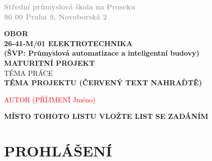 \documentclass[12pt,a4paper]{article} %
\begin{document}
\begin{titlepage}
\begin{minipage}{0.3\textwidth}
\end{minipage}
\begin{adjustbox}{minipage=0.55\textwidth,left}
	\textbf{\textcolor{darkgray}{
	Střední průmyslová škola na Proseku\\
	90 00 Praha 9, Novoborská 2}}
\end{adjustbox}

\center

\textbf{\large OBOR}\\[0.5cm]
\textbf{\large	26-41-M/01 ELEKTROTECHNIKA\\
				(ŠVP: Průmyslová automatizace a inteligentní budovy)}\\[4.5cm]
\textbf{\LARGE MATURITNÍ PROJEKT}\\[1.5cm]
\textsc{TÉMA PRÁCE}\\[1.5cm]
\textbf{\color{red} \huge \bfseries  TÉMA PROJEKTU (ČERVENÝ TEXT NAHRAĎTĚ)}

\vspace*{\fill}

\begin{minipage}{0.49\textwidth}
\begin{flushleft} \large
\the\year %
\end{flushleft}
\end{minipage}
\begin{minipage}{0.49\textwidth}
\begin{flushright}
\textcolor{red}{\large AUTOR (PŘÍJMENÍ Jméno)}
\end{flushright}
\end{minipage}


\end{titlepage}




\textbf{\color{red} \LARGE MÍSTO TOHOTO LISTU VLOŽTE LIST SE ZADÁNÍM}
\newpage

\section*{PROHLÁŠENÍ}
\end{document}
